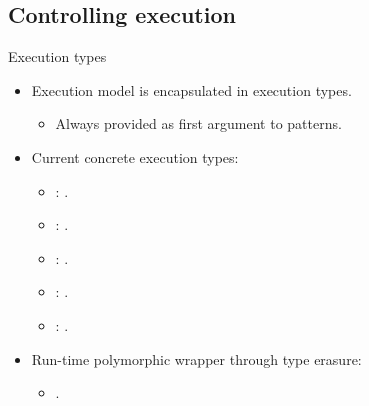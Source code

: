 \subsection{Controlling execution}

\begin{frame}[t]{Execution types}
\begin{itemize}
  \item Execution model is encapsulated in execution types.
    \begin{itemize}
      \item Always provided as first argument to patterns.
    \end{itemize}

  \vfill
  \item Current concrete execution types:
    \begin{itemize}
      \item {}: .
      \item {}: .
      \item {}: .
      \item {}: .
      \item {}: .
    \end{itemize}

  \vfill
  \item Run-time polymorphic wrapper through type erasure:
    \begin{itemize}
      \item {}.
    \end{itemize}
\end{itemize}
\end{frame}

